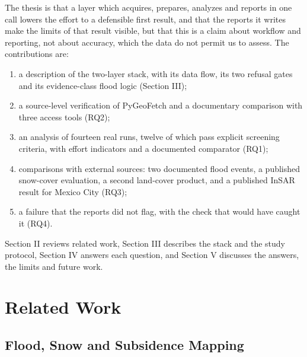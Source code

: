 \documentclass[conference]{IEEEtran}
\begin{document}
The thesis is that a layer which acquires, prepares, analyzes and reports in one call lowers the effort to a defensible first result, and that the reports it writes make the limits of that result visible, but that this is a claim about workflow and reporting, not about accuracy, which the data do not permit us to assess. The contributions are:

\begin{enumerate}
\item a description of the two-layer stack, with its data flow, its two refusal gates and its evidence-class flood logic (Section III);
\item a source-level verification of PyGeoFetch and a documentary comparison with three access tools (RQ2);
\item an analysis of fourteen real runs, twelve of which pass explicit screening criteria, with effort indicators and a documented comparator (RQ1);
\item comparisons with external sources: two documented flood events, a published snow-cover evaluation, a second land-cover product, and a published InSAR result for Mexico City (RQ3);
\item a failure that the reports did not flag, with the check that would have caught it (RQ4).
\end{enumerate}

Section II reviews related work, Section III describes the stack and the study protocol, Section IV answers each question, and Section V discusses the answers, the limits and future work.

\section{Related Work}

\subsection{Flood, Snow and Subsidence Mapping}
\end{document}
